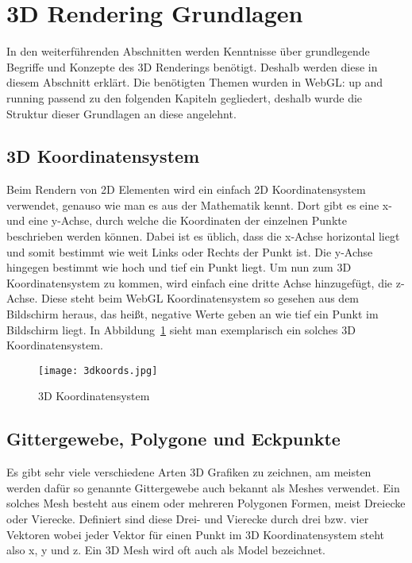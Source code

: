 \section{3D Rendering Grundlagen}
In den weiterführenden Abschnitten werden Kenntnisse über grundlegende Begriffe und Konzepte des 3D Renderings benötigt.
Deshalb werden diese in diesem Abschnitt erklärt.
Die benötigten Themen wurden in WebGL: up and running \cite[4-9]{parisi2012webgl} passend zu den folgenden Kapiteln gegliedert, deshalb wurde die Struktur dieser Grundlagen an diese angelehnt.

\subsection{3D Koordinatensystem}
Beim Rendern von 2D Elementen wird ein einfach 2D Koordinatensystem verwendet, genauso wie man es aus der Mathematik kennt. Dort gibt es eine x- und eine y-Achse, durch welche die Koordinaten der einzelnen Punkte beschrieben werden können.
Dabei ist es üblich, dass die x-Achse horizontal liegt und somit bestimmt wie weit Links oder Rechts der Punkt ist. Die y-Achse hingegen bestimmt wie hoch und tief ein Punkt liegt.
Um nun zum 3D Koordinatensystem zu kommen, wird einfach eine dritte Achse hinzugefügt, die z-Achse. Diese steht beim WebGL Koordinatensystem so gesehen aus dem Bildschirm heraus, das heißt,
 negative Werte geben an wie tief ein Punkt im Bildschirm liegt. \cite[4]{parisi2012webgl} In Abbildung~\ref{fig:3DKoordinatensystem} sieht man exemplarisch ein solches 3D Koordinatensystem.
 \begin{figure}
    \centering
    \texttt{[image: 3dkoords.jpg]}
    \caption{3D Koordinatensystem \cite{PeterStrohm}} \label{fig:3DKoordinatensystem}
    \end{figure}

\subsection{Gittergewebe, Polygone und Eckpunkte}
Es gibt sehr viele verschiedene Arten 3D Grafiken zu zeichnen, am meisten werden dafür so genannte Gittergewebe auch bekannt als Meshes verwendet.
Ein solches Mesh besteht aus einem oder mehreren Polygonen Formen, meist Dreiecke oder Vierecke. Definiert sind diese Drei- und Vierecke durch drei bzw.
vier Vektoren wobei jeder Vektor für einen Punkt im 3D Koordinatensystem steht also x, y und z.
Ein 3D Mesh wird oft auch als Model bezeichnet. \cite[4]{parisi2012webgl}

